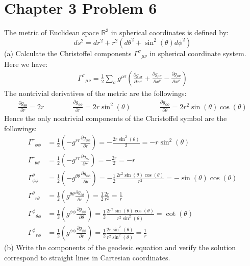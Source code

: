 \documentclass[11pt, onesided]{book}
\theoremstyle{break}
\theoremstyle{break}
\newcommand{\R}{\mathbb{R}}
\newcommand{\pd}{\partial}
\begin{document}
\section{Chapter 3 Problem 6}
The metric of Euclidean space $\R^3$ in spherical coordinates is defined by:
$$ds^2=  dr^2 + r^2(d\theta^2 + \sin^2(\theta) d\phi^2)$$
(a) Calculate the Christoffel components $\Gamma^\sigma{}_{\mu \nu}$ in spherical coordinate system. \\

Here we have:
\begin{align*}
\Gamma^\sigma{}_{\mu\nu} = \frac{1}{2}\sum_\sigma g^{\rho \sigma}\left( \frac{\pd g_{\nu \sigma}}{\pd x^\mu} + \frac{\pd g_{\mu \sigma}}{\pd x^\nu} - \frac{\pd g_{\mu\nu}}{\pd x^\sigma}\right)
\end{align*}
The nontrivial derivatives of the metric are the followings:
\begin{align*}
\frac{\pd g_{\theta\theta}}{\pd r} = 2r \qquad\qquad \frac{\pd g_{\phi\phi}}{\pd r} = 2r\sin^2(\theta) \qquad\qquad \frac{\pd g_{\phi\phi}}{\pd \theta} = 2r^2 \sin(\theta)\cos(\theta)
\end{align*}
Hence the only nontrivial components of the Christoffel symbol are the followings:
\begin{align*}
\Gamma^r{}_{\phi\phi}&=\frac{1}{2}\left( -g^{rr} \frac{\pd g_{\phi\phi}}{\pd r}\right) = - \frac{2r \sin^2(\theta)}{2}=-r\sin^2(\theta) \\
\Gamma^r{}_{\theta\theta}&= \frac{1}{2}\left(- g^{rr}\frac{\pd g_{\theta\theta}}{\pd r}\right) = -\frac{2r}{2} = -r  \\
\Gamma^\theta_{\phi\phi}&= \frac{1}{2}\left( -g^{\theta\theta} \frac{\pd g_{\phi\phi}}{\pd \theta}\right) =- \frac{1}{2}\frac{2r^2 \sin(\theta)\cos(\theta)}{r^2} = -\sin(\theta)\cos(\theta)\\
\Gamma^{\theta}{}_{r\theta} &= \frac{1}{2}\left(g^{\theta\theta} \frac{\pd g_{\theta\theta}}{\pd r} \right) =\frac{1}{2} \frac{2r}{r^2} = \frac{1}{r} \\
\Gamma^{\phi}{}_{\theta\phi} &= \frac{1}{2}\left(  g^{\phi\phi}\frac{\pd g_{\phi\phi}}{\pd \theta}\right) = \frac{1}{2}\frac{2r^2 \sin(\theta) \cos(\theta)}{r^2\sin^2(\theta)} = \cot(\theta)\\
\Gamma^{\phi}{}_{r\phi} &= \frac{1}{2}\left(  g^{\phi\phi}\frac{\pd g_{\phi\phi}}{\pd r}\right) = \frac{1}{2}\frac{2r \sin^2(\theta)}{r^2\sin^2(\theta)} = \frac{1}{r}
\end{align*}
(b) Write the components of the geodesic equation and verify the solution correspond to straight lines in Cartesian coordinates. \\
\end{document}
